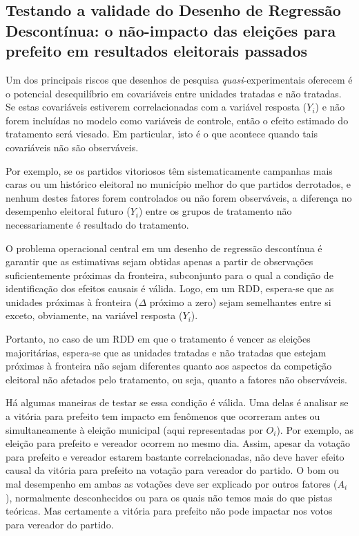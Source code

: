 \subsection{Testando a validade do Desenho de Regressão Descontínua: o não-impacto das eleições para prefeito em resultados eleitorais passados}

Um dos principais riscos que desenhos de pesquisa \emph{quasi}-experimentais oferecem é o potencial desequilíbrio em covariáveis entre unidades tratadas e não tratadas. Se estas covariáveis estiverem correlacionadas com a variável resposta ($Y_{i}$) e não forem incluídas no modelo como variáveis de controle, então o efeito estimado do tratamento será viesado. Em particular, isto é o que acontece quando tais covariáveis não são observáveis.

Por exemplo, se os partidos vitoriosos têm sistematicamente campanhas mais caras ou um histórico eleitoral no município melhor do que partidos derrotados, e nenhum destes fatores forem controlados ou não forem observáveis, a diferença no desempenho eleitoral futuro ($Y_{i}$) entre os grupos de tratamento não necessariamente é resultado do tratamento.

O problema operacional central em um desenho de regressão descontínua é garantir que as estimativas sejam obtidas apenas a partir de observações suficientemente próximas da fronteira, subconjunto para o qual a condição de identificação dos efeitos causais é válida. Logo, em um RDD, espera-se que as unidades próximas à fronteira ($\Delta$ próximo a zero) sejam semelhantes entre si exceto, obviamente, na variável resposta ($Y_{i}$).

Portanto, no caso de um RDD em que o tratamento é vencer as eleições majoritárias, espera-se que as unidades tratadas e não tratadas que estejam próximas à fronteira não sejam diferentes quanto aos aspectos da competição eleitoral não afetados pelo tratamento, ou seja, quanto a fatores não observáveis.

Há algumas maneiras de testar se essa condição é válida. Uma delas é analisar se a vitória para prefeito tem impacto em fenômenos que ocorreram antes ou simultaneamente à eleição municipal (aqui representadas por $O_{i}$). Por exemplo, as eleição para prefeito e vereador ocorrem no mesmo dia. Assim, apesar da votação para prefeito e vereador estarem bastante correlacionadas, não deve haver efeito causal da vitória para prefeito na votação para vereador do partido. O bom ou mal desempenho em ambas as votações deve ser explicado por outros fatores ($A_{i}$), normalmente desconhecidos ou para os quais não temos mais do que pistas teóricas. Mas certamente a vitória para prefeito não pode impactar nos votos para vereador do partido. 

